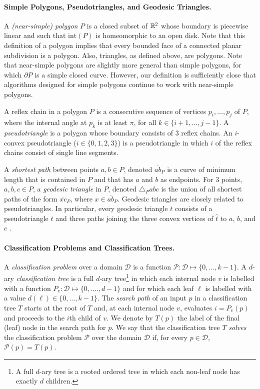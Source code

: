 \documentclass[lotsofwhite]{patmorin}
\newcommand{\boundary}{\partial}
\newcommand{\interior}{\mathrm{int}}
\newcommand{\z}[1]{{\hat{#1}}}
\begin{document}
\paragraph{Simple Polygons, Pseudotriangles, and Geodesic Triangles.}

A \emph{(near-simple) polygon} $P$ is a closed subset of $\mathbb{R}^2$ whose
boundary is piecewise linear and such that $\interior(P)$ is
homeomorphic to an open disk.  Note that this definition of a polygon
implies that every bounded face of a connected planar subdivision is a
polygon.  Also, triangles, as defined above, are polygons.  Note that
near-simple polygons are slightly more general than simple polygons,
for which $\boundary P$ is a simple closed curve.  However, our
definition is sufficiently close that algorithms designed for simple
polygons continue to work with near-simple polygons.

A reflex chain in a polygon $P$ is a consecutive sequence of vertices
$p_i,\ldots,p_j$ of $P$, where the internal angle at $p_k$ is at least
$\pi$, for all $k\in\{i+1,\ldots,j-1\}$. A \emph{pseudotriangle} is a
polygon whose boundary consists of 3 reflex chains.  An $i$-convex
pseudotriangle ($i\in\{0,1,2,3\}$) is a pseudotriangle in which $i$ of
the reflex chains consist of single line segments.

A \emph{shortest path} between points $a,b\in P$, denoted
$\overline{ab}_P$ is a curve of minimum length that is contained in
$P$ and that has $a$ and $b$ as endpoints.  For 3 points, $a,b,c\in
P$, a \emph{geodesic triangle} in $P$, denoted $\triangle_P abc$ is
the union of all shortest paths of the form $\overline{xc}_P$, where
$x\in\overline{ab}_P$.  Geodesic triangles are closely related to
pseudotriangles.  In particular, every geodesic triangle $t$ consists
of a pseudotriangle $\z t$ and three paths joining the three convex
vertices of $\z t$ to $a$, $b$, and $c$ \cite[Section~8.4]{rss06}.

\paragraph{Classification Problems and Classification Trees.}

A \emph{classification problem} over a domain $\mathcal{D}$ is a
function $\mathcal{P}:\mathcal{D}\mapsto \{0,\ldots,k-1\}$.  A
$d$-ary \emph{classification tree} is a full $d$-ary tree\footnote{A
full $d$-ary tree is a rooted ordered tree in which each non-leaf node
has exactly $d$ children.} in which each internal node $v$ is labelled
with a function $P_v:\mathcal{D}\mapsto\{0,.\ldots,d-1\}$ and for
which each leaf $\ell$ is labelled with a value
$d(\ell)\in\{0,\ldots,k-1\}$. The \emph{search path} of an input $p$
in a classification tree $T$ starts at the root of $T$ and, at each
internal node $v$, evaluates $i=P_v(p)$ and proceeds to the $i$th
child of $v$.  We denote by $T(p)$ the label of the final (leaf) node
in the search path for $p$.  We say that the classification tree $T$
\emph{solves} the classification problem $\mathcal{P}$ over the domain
$\mathcal{D}$ if, for every $p\in \mathcal{D}$, $\mathcal{P}(p)=T(p)$.
\end{document}
